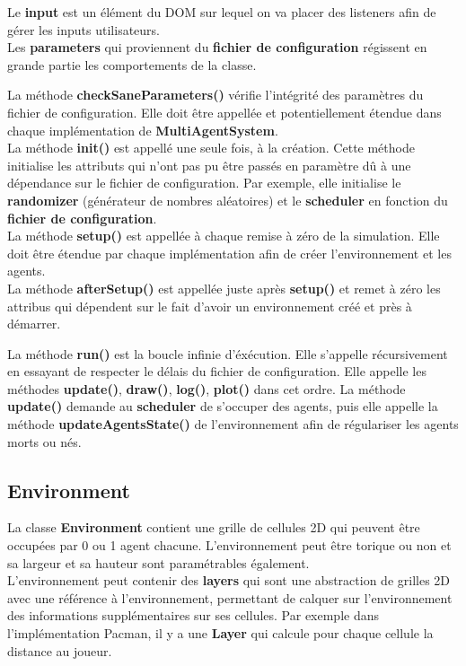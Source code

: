 \documentclass[11pt,a4paper,oneside]{report}
\begin{document}
\par
Le \textbf{input} est un élément du DOM sur lequel on va placer des listeners afin de gérer les inputs utilisateurs.\\
Les \textbf{parameters} qui proviennent du \textbf{fichier de configuration} régissent en grande partie les comportements de la classe.
\par
La méthode \textbf{checkSaneParameters()} vérifie l'intégrité des paramètres du fichier de configuration. Elle doit être appellée et potentiellement étendue dans chaque implémentation de \textbf{MultiAgentSystem}.\\
La méthode \textbf{init()} est appellé une seule fois, à la création. Cette méthode initialise les attributs qui n'ont pas pu être passés en paramètre dû à une dépendance sur le fichier de configuration. Par exemple, elle initialise le \textbf{randomizer} (générateur de nombres aléatoires) et le \textbf{scheduler} en fonction du \textbf{fichier de configuration}.\\
La méthode \textbf{setup()} est appellée à chaque remise à zéro de la simulation. Elle doit être étendue par chaque implémentation afin de créer l'environnement et les agents.\\
La méthode \textbf{afterSetup()} est appellée juste après \textbf{setup()} et remet à zéro les attribus qui dépendent sur le fait d'avoir un environnement créé et près à démarrer.
\par
La méthode \textbf{run()} est la boucle infinie d'éxécution. Elle s'appelle récursivement en essayant de respecter le délais du fichier de configuration. Elle appelle les méthodes \textbf{update()}, \textbf{draw()}, \textbf{log()}, \textbf{plot()} dans cet ordre.
La méthode \textbf{update()} demande au \textbf{scheduler} de s'occuper des agents, puis elle appelle la méthode \textbf{updateAgentsState()} de l'environnement afin de régulariser les agents morts ou nés.

\subsection*{Environment}
La classe \textbf{Environment} contient une grille de cellules 2D qui peuvent être occupées par 0 ou 1 agent chacune. L'environnement peut être torique ou non et sa largeur et sa hauteur sont paramétrables également.\\
L'environnement peut contenir des \textbf{layers} qui sont une abstraction de grilles 2D avec une référence à l'environnement, permettant de calquer sur l'environnement des informations supplémentaires sur ses cellules. Par exemple dans l'implémentation Pacman, il y a une \textbf{Layer} qui calcule pour chaque cellule la distance au joueur.\\
\end{document}
